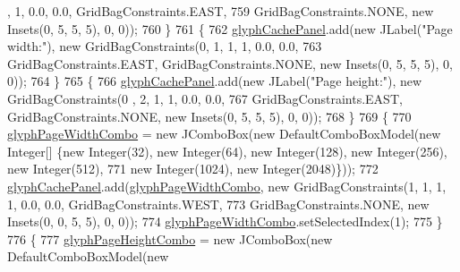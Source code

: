 \begin{DoxyCode}
      , 1, 0.0, 0.0, GridBagConstraints.EAST,
759                         GridBagConstraints.NONE, \textcolor{keyword}{new} Insets(0, 5, 5, 5), 0, 0));
760                 \}
761                 \{
762                     \mbox{\hyperlink{classorg_1_1newdawn_1_1slick_1_1tools_1_1hiero_1_1_hiero_a2a248f40f119ae31da5353e42be42662}{glyphCachePanel}}.add(\textcolor{keyword}{new} JLabel(\textcolor{stringliteral}{"Page width:"}), \textcolor{keyword}{new} GridBagConstraints(0,
       1, 1, 1, 0.0, 0.0,
763                         GridBagConstraints.EAST, GridBagConstraints.NONE, \textcolor{keyword}{new} Insets(0, 5, 5, 5), 0, 0));
764                 \}
765                 \{
766                     \mbox{\hyperlink{classorg_1_1newdawn_1_1slick_1_1tools_1_1hiero_1_1_hiero_a2a248f40f119ae31da5353e42be42662}{glyphCachePanel}}.add(\textcolor{keyword}{new} JLabel(\textcolor{stringliteral}{"Page height:"}), \textcolor{keyword}{new} GridBagConstraints(0
      , 2, 1, 1, 0.0, 0.0,
767                         GridBagConstraints.EAST, GridBagConstraints.NONE, \textcolor{keyword}{new} Insets(0, 5, 5, 5), 0, 0));
768                 \}
769                 \{
770                     \mbox{\hyperlink{classorg_1_1newdawn_1_1slick_1_1tools_1_1hiero_1_1_hiero_a27e8ebe1ca05ea8252bf38dc2bb73b02}{glyphPageWidthCombo}} = \textcolor{keyword}{new} JComboBox(\textcolor{keyword}{new} DefaultComboBoxModel(\textcolor{keyword}{new} 
      Integer[] \{\textcolor{keyword}{new} Integer(32), \textcolor{keyword}{new} Integer(64), \textcolor{keyword}{new} Integer(128), \textcolor{keyword}{new} Integer(256), \textcolor{keyword}{new} Integer(512),
771                         \textcolor{keyword}{new} Integer(1024), \textcolor{keyword}{new} Integer(2048)\}));
772                     \mbox{\hyperlink{classorg_1_1newdawn_1_1slick_1_1tools_1_1hiero_1_1_hiero_a2a248f40f119ae31da5353e42be42662}{glyphCachePanel}}.add(\mbox{\hyperlink{classorg_1_1newdawn_1_1slick_1_1tools_1_1hiero_1_1_hiero_a27e8ebe1ca05ea8252bf38dc2bb73b02}{glyphPageWidthCombo}}, \textcolor{keyword}{new} 
      GridBagConstraints(1, 1, 1, 1, 0.0, 0.0, GridBagConstraints.WEST,
773                         GridBagConstraints.NONE, \textcolor{keyword}{new} Insets(0, 0, 5, 5), 0, 0));
774                     \mbox{\hyperlink{classorg_1_1newdawn_1_1slick_1_1tools_1_1hiero_1_1_hiero_a27e8ebe1ca05ea8252bf38dc2bb73b02}{glyphPageWidthCombo}}.setSelectedIndex(1);
775                 \}
776                 \{
777                     \mbox{\hyperlink{classorg_1_1newdawn_1_1slick_1_1tools_1_1hiero_1_1_hiero_af25be89f1cd46381e5e6fc93a02de118}{glyphPageHeightCombo}} = \textcolor{keyword}{new} JComboBox(\textcolor{keyword}{new} DefaultComboBoxModel(\textcolor{keyword}{new} 

\end{DoxyCode}

